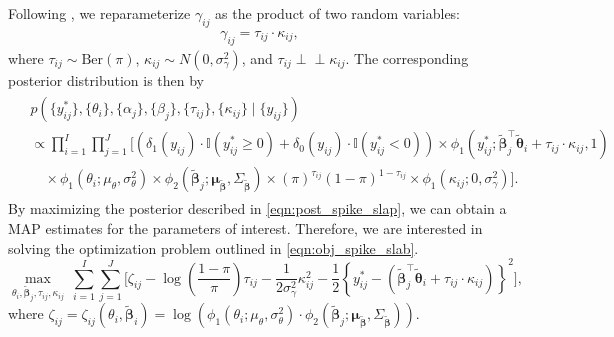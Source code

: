 \documentclass[11pt]{article}
\newcommand{\indep}{\perp \!\!\! \perp}
\begin{document}
Following \cite{Polson_2018}, we reparameterize $ \gamma_{ij} $ as the product of two random variables:
\begin{align*}
    \gamma_{ij} = \tau_{ij} \cdot \kappa_{ij},
\end{align*}
where $\tau_{ij} \sim \text{Ber}(\pi)$, $\kappa_{ij} \sim N(0, \sigma_\gamma^2)$, and $\tau_{ij} \indep \kappa_{ij}$. The corresponding posterior distribution is then by
\begin{align}\label{eqn:post_spike_slap}
    \begin{split}
        &p\left(\{y_{ij}^*\}, \{\theta_i\}, \{\alpha_j\}, \{\beta_j\}, \{\tau_{ij}\}, \{\kappa_{ij}\} \mid \{y_{ij}\}\right) \\
        &\propto \prod_{i=1}^I \prod_{j = 1}^J \bigg[ \left(\delta_1 (y_{ij})\cdot \mathbb{I}(y_{ij}^* \geq 0) + \delta_0 (y_{ij})\cdot \mathbb{I}(y_{ij}^* < 0) \right) \times  \phi_1\left(y_{ij}^*; \boldsymbol{\tilde{\beta}}_j^\top \boldsymbol{\tilde{\theta}}_i + \tau_{ij}\cdot \kappa_{ij}, 1\right)\\
        &\quad  \times \phi_1\left(\theta_i; \mu_{\theta}, \sigma_{\theta}^2 \right) \times \phi_{2}\left(\boldsymbol{\tilde{\beta}}_j ; \boldsymbol{\mu}_{\boldsymbol{\tilde{\beta}}}, \Sigma_{\boldsymbol{\tilde{\beta}}}\right) \times  (\pi)^{\tau_{ij}}(1-\pi)^{1-\tau_{ij}} \times \phi_1(\kappa_{ij}; 0, \sigma_\gamma^2) \bigg].
    \end{split}
\end{align}
By maximizing the posterior described in \eqref{eqn:post_spike_slap}, we can obtain a MAP estimates for the parameters of interest. Therefore, we are interested in solving the optimization problem outlined in \eqref{eqn:obj_spike_slab}.
\begin{equation}\label{eqn:obj_spike_slab}
    \underset{\theta_i, \boldsymbol{\tilde{\beta}}_j, \tau_{ij}, \kappa_{ij}}{\max} ~\sum_{i=1}^I \sum_{j = 1}^J \bigg[ \zeta_{ij} - \log\left(\dfrac{1-\pi}{\pi}\right) \tau_{ij} - \dfrac{1}{2\sigma_\gamma^2} \kappa_{ij}^2 - \dfrac{1}{2}\left\{ y_{ij}^* - (\boldsymbol{\tilde{\beta}}_j^\top \boldsymbol{\tilde{\theta}}_i + \tau_{ij}\cdot \kappa_{ij})\right\}^2 \bigg],
\end{equation}
where $\zeta_{ij} = \zeta_{ij}(\theta_i, \boldsymbol{\tilde{\beta}}_i) = \log\left(\phi_1\left(\theta_i; \mu_{\theta}, \sigma_{\theta}^2 \right) \cdot \phi_{2}\left(\boldsymbol{\tilde{\beta}}_j ; \boldsymbol{\mu}_{\boldsymbol{\tilde{\beta}}}, \Sigma_{\boldsymbol{\tilde{\beta}}}\right)\right)$.
\end{document}

